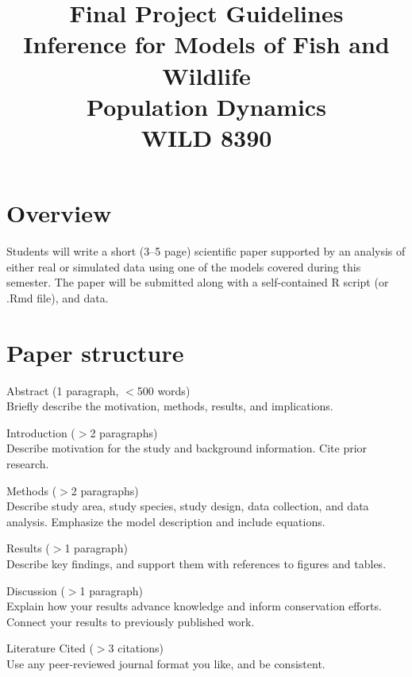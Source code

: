 \documentclass[12pt]{article}
\title{Final Project Guidelines \\ %
  Inference for Models of Fish and Wildlife \\ Population Dynamics \\ WILD 8390}
\date{}
\begin{document}
\maketitle

\vspace{-48pt}

\section*{Overview}

Students will write a short (3--5 page) scientific paper supported by
an analysis of either real or simulated data using one of the models
covered during this semester. The paper will be submitted
along with a self-contained R script (or .Rmd file), and data.


\section*{Paper structure}

Abstract (1 paragraph, $<$500 words) \\
Briefly describe the motivation, methods, results, and
implications. %
\vspace{6pt}

Introduction ($>$2 paragraphs) \\
Describe motivation for the study and background information. Cite
prior research. 
\vspace{6pt}

Methods  ($>$2 paragraphs) \\
Describe study area, study species, study design, data collection, and
data analysis. Emphasize the model description and include equations.
\vspace{6pt}

Results  ($>$1 paragraph) \\
Describe key findings, and support them with references to figures and tables.
\vspace{6pt}

Discussion  ($>$1 paragraph) \\
Explain how your results advance knowledge and inform conservation
efforts. Connect your results to previously published work.
\vspace{6pt}

Literature Cited  ($>$3 citations) \\
Use any peer-reviewed journal format you like, and be consistent.
\end{document}
